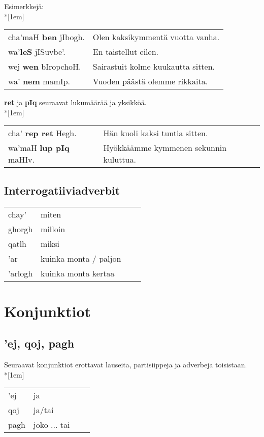 \documentclass{book}
\begin{document}
Esimerkkejä:\\*[1em]
\begin{tabular}{l l}
    cha'maH \textbf{ben} jIbogh. & Olen kaksikymmentä vuotta vanha. \\
    wa'\textbf{leS} jISuvbe'. & En taistellut eilen. \\
    wej \textbf{wen} bIropchoH. & Sairastuit kolme kuukautta sitten. \\
    wa' \textbf{nem} mamIp. & Vuoden päästä olemme rikkaita. \\
\end{tabular}

\textbf{ret} ja \textbf{pIq} seuraavat lukumäärää ja yksikköä.\\*[1em]
\begin{tabular}{l l}
    cha' \textbf{rep ret} Hegh. & Hän kuoli kaksi tuntia sitten. \\
    wa'maH \textbf{lup pIq} maHIv. & Hyökkäämme kymmenen sekunnin kuluttua. \\
\end{tabular}

\section{Interrogatiiviadverbit}

\begin{tabular}{Bl Il}
    chay' & miten \\
    ghorgh & milloin \\
    qatlh & miksi \\
    'ar & kuinka monta / paljon \\
    'arlogh & kuinka monta kertaa \\
\end{tabular}

\chapter{Konjunktiot}

\section{'ej, qoj, pagh}

Seuraavat konjunktiot erottavat lauseita, partisiippeja ja adverbeja toisistaan.\\*[1em]
\begin{tabular}{Bl Il}
    'ej & ja \\
    qoj & ja/tai \\
    pagh & joko ... tai \\
\end{tabular}
\end{document}
